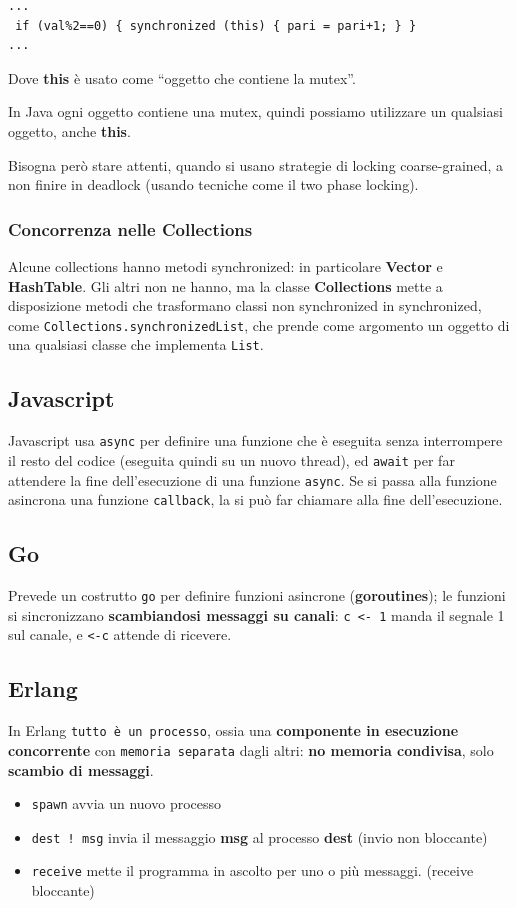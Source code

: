 \documentclass[a4paper,10pt]{article}
\begin{document}
\begin{lstlisting}
...
 if (val%2==0) { synchronized (this) { pari = pari+1; } }
...
\end{lstlisting}

Dove \textbf{this} è usato come ``oggetto che contiene la mutex''.\smallskip

In Java ogni oggetto contiene una mutex, quindi possiamo utilizzare un qualsiasi oggetto, anche \textbf{this}.\smallskip

Bisogna però stare attenti, quando si usano strategie di locking coarse-grained, a non finire in deadlock (usando tecniche come il two phase locking).
\subsubsection{Concorrenza nelle Collections}

Alcune collections hanno metodi synchronized: in particolare \textbf{Vector} e \textbf{HashTable}. Gli altri non ne hanno, ma la classe \textbf{Collections} mette a disposizione metodi che trasformano classi non synchronized in synchronized, come \texttt{Collections.synchronizedList}, che prende come argomento un oggetto di una qualsiasi classe che implementa \texttt{List}.

\subsection{Javascript}
Javascript usa \texttt{async} per definire una funzione che è eseguita senza interrompere il resto del codice (eseguita quindi su un nuovo thread), ed \texttt{await} per far attendere la fine dell'esecuzione di una funzione \texttt{async}. Se si passa alla funzione asincrona una funzione \texttt{callback}, la si può far chiamare alla fine dell'esecuzione.

\subsection{Go}
Prevede un costrutto \texttt{go} per definire funzioni asincrone (\textbf{goroutines}); le funzioni si sincronizzano \textbf{scambiandosi messaggi su canali}: \texttt{c <- 1} manda il segnale 1 sul canale, e \texttt{<-c} attende di ricevere.

\subsection{Erlang}
In Erlang \texttt{tutto è un processo}, ossia una \textbf{componente in esecuzione concorrente} con \texttt{memoria separata} dagli altri: \textbf{no memoria condivisa}, solo \textbf{scambio di messaggi}.

\begin{itemize}
 \item \texttt{spawn} avvia un nuovo processo
 \item \texttt{dest ! msg} invia il messaggio \textbf{msg} al processo \textbf{dest} (invio non bloccante)
 \item \texttt{receive} mette il programma in ascolto per uno o più messaggi. (receive bloccante)
\end{itemize}
\end{document}
